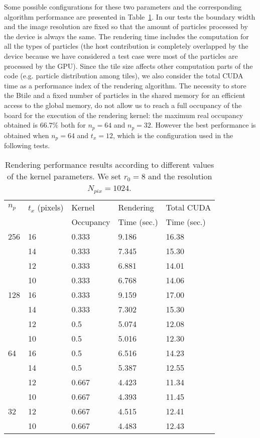 \documentclass[1p]{elsarticle}
\begin{document}
Some possible configurations for these two parameters and the corresponding algorithm performance are presented in Table~\ref{tab:tuning}. In our tests the boundary width and the image resolution are fixed so that the amount of particles processed by the device is always the same. The rendering time includes the computation for all the types of particles (the host contribution is completely overlapped by the device because we have considered a test case were most of the particles are processed by the GPU). Since the tile size affects other computation parts of the code (e.g. particle distribution among tiles), we also consider the total CUDA time as a performance index of the rendering algorithm. 
The necessity to store the Btile and a fixed number of particles in the shared memory for an efficient access to the global memory, do not allow us to reach a full occupancy of the board for the execution of the rendering kernel: the maximum real occupancy obtained is $66.7\%$ both for $n_p = 64$ and $n_p=32$. However the best performance is obtained when $n_p=64$ and $t_x = 12$, which is the configuration used in the following tests.

\begin{table}
\begin{center}
\begin{tabular}{|l|l|l|l|l|}
\hline
$n_p$ & $t_x$ (pixels) & Kernel & Rendering & Total CUDA \\
& & Occupancy & Time (sec.) & Time (sec.) \\
\hline
256   & 16 & 0.333 & 9.186 & 16.38 \\
\hline
      & 14 & 0.333 & 7.345  & 15.30 \\
\hline
      & 12 & 0.333 & 6.881  & 14.01 \\
\hline
      & 10 & 0.333 & 6.768 & 14.06 \\
\hline
128   & 16 & 0.333 & 9.159 & 17.00 \\
\hline
      & 14 & 0.333 & 7.302  & 15.30 \\
\hline
      & 12 & 0.5 & 5.074  & 12.08 \\
\hline
      & 10 & 0.5 & 5.016 & 12.30 \\ 
\hline
64    & 16 & 0.5 & 6.516 & 14.23 \\
\hline
      & 14 & 0.5 & 5.387 & 12.55 \\
\hline
      & 12 & 0.667 & 4.423 & 11.34 \\
\hline
      & 10 & 0.667 & 4.393 & 11.45 \\ 
\hline
32    & 12 & 0.667 & 4.515 & 12.41 \\
\hline
      & 10 & 0.667 & 4.483 & 12.43 \\ 
\hline
\end{tabular}
\caption{Rendering performance results according to different values of the kernel parameters. We set $r_0=8$ and the resolution $N_{pix}=1024$.}
\end{center}
\label{tab:tuning}
\end{table}
\end{document}

